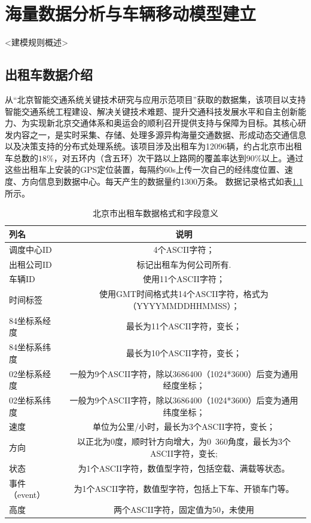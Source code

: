 \chapter{海量数据分析与车辆移动模型建立}

<建模规则概述>

\section{出租车数据介绍}
从“北京智能交通系统关键技术研究与应用示范项目”获取的数据集，该项目以支持智能交通系统工程建设、解决关键技术难题、提升交通科技发展水平和自主创新能力、为实现新北京交通体系和奥运会的顺利召开提供支持与保障为目标。其核心研发内容之一，是实时采集、存储、处理多源异构海量交通数据、形成动态交通信息以及决策支持的分布式处理系统。该项目涉及出租车为12096辆，约占北京市出租车总数的$18\%$，对五环内（含五环）次干路以上路网的覆盖率达到$90\%$以上。通过这些出租车上安装的GPS定位装置，每隔约60s上传一次自己的经纬度位置、速度、方向信息到数据中心。每天产生的数据量约1300万条。
数据记录格式如表\ref{table_dataset}所示。

\begin{table}
\caption{北京市出租车数据格式和字段意义}\label{table_dataset}
\begin{tabular}{l|c}
\hline
列名&	说明\\
\hline
调度中心ID&	4个ASCII字符；\\
\hline
出租公司ID&	标记出租车为何公司所有.\\
\hline
车辆ID&	使用11个ASCII字符；\\
\hline
时间标签&	使用GMT时间格式共14个ASCII字符，格式为（YYYYMMDDHHMMSS）；\\
\hline
84坐标系经度&	最长为11个ASCII字符，变长；\\
\hline
84坐标系纬度&	最长为10个ASCII字符，变长；\\
\hline
02坐标系经度&	一般为9个ASCII字符，除以3686400（1024*3600）后变为通用经度坐标；\\
\hline
02坐标系纬度&	一般为9个ASCII字符，除以3686400（1024*3600）后变为通用纬度坐标；\\
\hline
速度&	单位为公里/小时，最长为3个ASCII字符，变长；\\
\hline
方向&	以正北为0度，顺时针方向增大，为0~360角度，最长为3个ASCII字符，变长;\\
\hline
状态&	为1个ASCII字符，数值型字符，包括空载、满载等状态。\\
\hline
事件（event）&	为1个ASCII字符，数值型字符，包括上下车、开锁车门等。\\
\hline
高度&	两个ASCII字符，固定值为50，未使用\\
\hline
\end{tabular}
\end{table}



